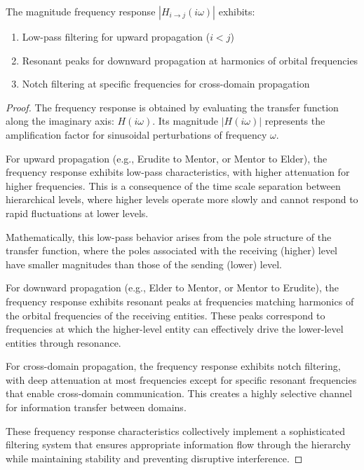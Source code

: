 \begin{theorem}
The magnitude frequency response $|H_{i \to j}(i\omega)|$ exhibits:
\begin{enumerate}
    \item Low-pass filtering for upward propagation ($i < j$)
    \item Resonant peaks for downward propagation at harmonics of orbital frequencies
    \item Notch filtering at specific frequencies for cross-domain propagation
\end{enumerate}
\end{theorem}

\begin{proof}
The frequency response is obtained by evaluating the transfer function along the imaginary axis: $H(i\omega)$. Its magnitude $|H(i\omega)|$ represents the amplification factor for sinusoidal perturbations of frequency $\omega$.

For upward propagation (e.g., Erudite to Mentor, or Mentor to Elder), the frequency response exhibits low-pass characteristics, with higher attenuation for higher frequencies. This is a consequence of the time scale separation between hierarchical levels, where higher levels operate more slowly and cannot respond to rapid fluctuations at lower levels.

Mathematically, this low-pass behavior arises from the pole structure of the transfer function, where the poles associated with the receiving (higher) level have smaller magnitudes than those of the sending (lower) level.

For downward propagation (e.g., Elder to Mentor, or Mentor to Erudite), the frequency response exhibits resonant peaks at frequencies matching harmonics of the orbital frequencies of the receiving entities. These peaks correspond to frequencies at which the higher-level entity can effectively drive the lower-level entities through resonance.

For cross-domain propagation, the frequency response exhibits notch filtering, with deep attenuation at most frequencies except for specific resonant frequencies that enable cross-domain communication. This creates a highly selective channel for information transfer between domains.

These frequency response characteristics collectively implement a sophisticated filtering system that ensures appropriate information flow through the hierarchy while maintaining stability and preventing disruptive interference.
\end{proof}

